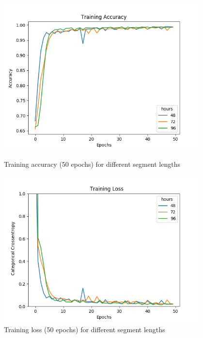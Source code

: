 \begin{figure}
      \includegraphics[height=8cm]{img/control_condition/plot_acc_train_50e.png}
      \caption{Training accuracy (50 epochs) for different segment lengths}
      \label{figure:control_condition_acc_train_50e}

      \includegraphics[height=8cm]{img/control_condition/plot_loss_train_50e.png}
      \caption{Training loss (50 epochs) for different segment lengths}
      \label{figure:control_condition_loss_train_50e}
\end{figure}

